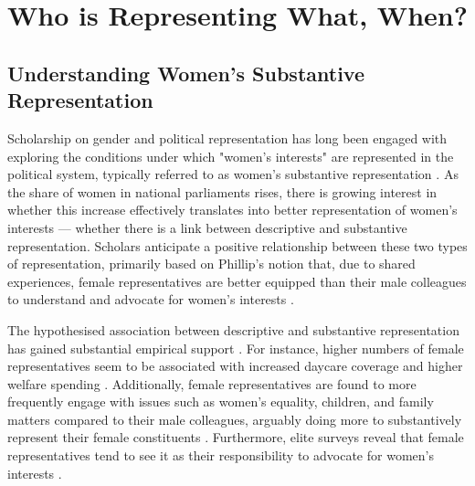 

\section*{Who is Representing What, When?}
\subsection*{Understanding Women's Substantive Representation}
Scholarship on gender and political representation has long been engaged with exploring the conditions under which "women's interests" are represented in the political system, typically referred to as women's substantive representation \parencite{pitkin_concept_1967}. 
As the share of women in national parliaments rises, there is growing interest in whether this increase effectively translates into better representation of women's interests — whether there is a link between descriptive and substantive representation. Scholars anticipate a positive relationship between these two types of representation, primarily based on Phillip's \parencite*{phillips_politics_1998} notion that, due to shared experiences, female representatives are better equipped than their male colleagues to understand and advocate for women's interests \parencite{bratton_descriptive_2002, bolzendahl_womens_2007, brooks_social_2006, clayton_quota_2018}. 

The hypothesised association between descriptive and substantive representation has gained substantial empirical support \parencite[see][for an overview]{wangnerud_women_2009}. For instance, higher numbers of female representatives seem to be associated with increased daycare coverage \parencite{bratton_descriptive_2002} and higher welfare spending \parencite{bolzendahl_womens_2007, brooks_social_2006, clayton_quota_2018}. Additionally, female representatives are found to more frequently engage with issues such as women's equality, children, and family matters compared to their male colleagues, arguably doing more to substantively represent their female constituents \parencite{clayton_quotas_2017,unal_role_2021,schwindt-bayer_still_2006}. Furthermore, elite surveys reveal that female representatives tend to see it as their responsibility to advocate for women's interests \parencite{reingold_concepts_1992}.

